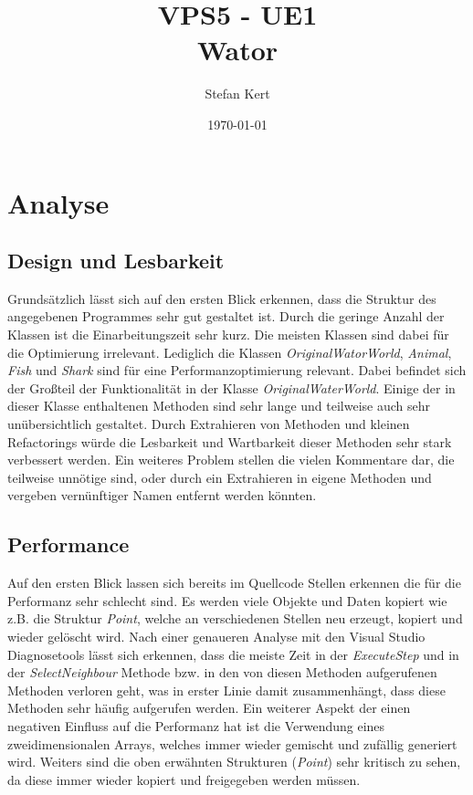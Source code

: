 \documentclass[a4paper,ngerman]{scrartcl}
\begin{document}
\title{VPS5 - UE1\\
Wator}
\author{Stefan Kert}
\date{\today}
\maketitle

\section{Analyse}
\subsection{Design und Lesbarkeit}
Grundsätzlich lässt sich auf den ersten Blick erkennen, dass die Struktur des angegebenen Programmes sehr gut gestaltet ist. Durch die geringe Anzahl der Klassen ist die Einarbeitungszeit sehr kurz. Die meisten Klassen sind dabei für die Optimierung irrelevant. Lediglich die Klassen \textit{OriginalWatorWorld}, \textit{Animal}, \textit{Fish} und \textit{Shark} sind für eine Performanzoptimierung relevant. Dabei befindet sich der Großteil der Funktionalität in der Klasse \textit{OriginalWaterWorld}. Einige der in dieser Klasse enthaltenen Methoden sind sehr lange und teilweise auch sehr unübersichtlich gestaltet. Durch Extrahieren von Methoden und kleinen Refactorings würde die Lesbarkeit und Wartbarkeit dieser Methoden sehr stark verbessert werden. Ein weiteres Problem stellen die vielen Kommentare dar, die teilweise unnötige sind, oder durch ein Extrahieren in eigene Methoden und vergeben vernünftiger Namen entfernt werden könnten.

\subsection{Performance}
Auf den ersten Blick lassen sich bereits im Quellcode Stellen erkennen die für die Performanz sehr schlecht sind. Es werden viele Objekte und Daten kopiert wie z.B. die Struktur \textit{Point}, welche an verschiedenen Stellen neu erzeugt, kopiert und wieder gelöscht wird. Nach einer genaueren Analyse mit den Visual Studio Diagnosetools lässt sich erkennen, dass die meiste Zeit in der \textit{ExecuteStep} und in der \textit{SelectNeighbour} Methode bzw. in den von diesen Methoden aufgerufenen Methoden verloren geht, was in erster Linie damit zusammenhängt, dass diese Methoden sehr häufig aufgerufen werden. Ein weiterer Aspekt der einen negativen Einfluss auf die Performanz hat ist die Verwendung eines zweidimensionalen Arrays, welches immer wieder gemischt und zufällig generiert wird. Weiters sind die oben erwähnten Strukturen (\textit{Point}) sehr kritisch zu sehen, da diese immer wieder kopiert und freigegeben werden müssen.
\end{document}
